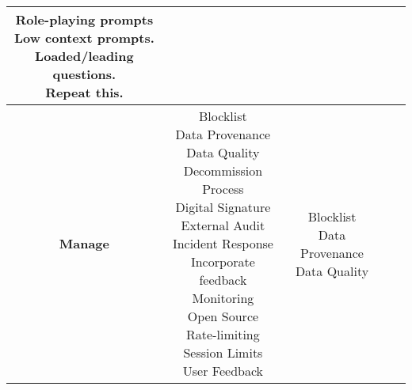\documentclass[fleqn]{article}
\begin{document}
\begin{landscape}
\begin{table}[H]
\begin{tabular}{|c|c|c|c|c|}
{			\textbullet\hspace{3pt} Role-playing prompts \\
			\textbullet\hspace{3pt} Low context prompts. \\ 
			\textbullet\hspace{3pt} Loaded/leading questions.  \\ 
			\textbullet\hspace{3pt} Repeat this. \\
		}
		& \\
		\hline
		\textbf{Manage} & \makecell[l]{
			\textbullet\hspace{3pt} Blocklist \\
			\textbullet\hspace{3pt} Data Provenance\\
			\textbullet\hspace{3pt} Data Quality\\  	 
			\textbullet\hspace{3pt} Decommission Process\\ 
			\textbullet\hspace{3pt} Digital Signature\\ 	
			\textbullet\hspace{3pt} External Audit\\ 
			\textbullet\hspace{3pt} Incident Response\\ 
			\textbullet\hspace{3pt} Incorporate feedback \\ 
			\textbullet\hspace{3pt} Monitoring\\ 	
			\textbullet\hspace{3pt} Open Source\\ 
			\textbullet\hspace{3pt} Rate-limiting \\ 	
			\textbullet\hspace{3pt} Session Limits\\ 	
			\textbullet\hspace{3pt} User Feedback\\ 					 	 
		} 
		& \makecell[l]{
			\textbullet\hspace{3pt} Blocklist \\
			\textbullet\hspace{3pt} Data Provenance\\
			\textbullet\hspace{3pt} Data Quality\\  	 
}
\end{tabular}
\end{table}
\end{landscape}
\end{document}
